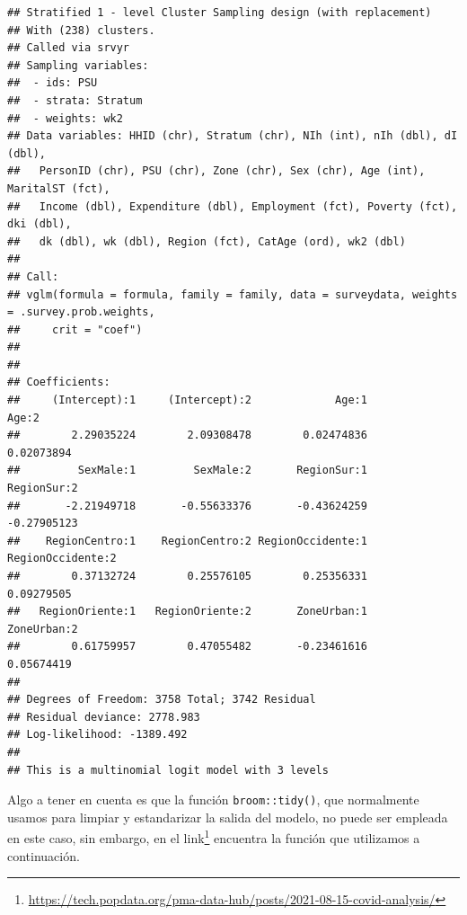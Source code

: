 \documentclass[
  12pt,
]{book}
\begin{document}
\begin{verbatim}
## Stratified 1 - level Cluster Sampling design (with replacement)
## With (238) clusters.
## Called via srvyr
## Sampling variables:
##  - ids: PSU
##  - strata: Stratum
##  - weights: wk2
## Data variables: HHID (chr), Stratum (chr), NIh (int), nIh (dbl), dI (dbl),
##   PersonID (chr), PSU (chr), Zone (chr), Sex (chr), Age (int), MaritalST (fct),
##   Income (dbl), Expenditure (dbl), Employment (fct), Poverty (fct), dki (dbl),
##   dk (dbl), wk (dbl), Region (fct), CatAge (ord), wk2 (dbl)
## 
## Call:
## vglm(formula = formula, family = family, data = surveydata, weights = .survey.prob.weights, 
##     crit = "coef")
## 
## 
## Coefficients:
##     (Intercept):1     (Intercept):2             Age:1             Age:2 
##        2.29035224        2.09308478        0.02474836        0.02073894 
##         SexMale:1         SexMale:2       RegionSur:1       RegionSur:2 
##       -2.21949718       -0.55633376       -0.43624259       -0.27905123 
##    RegionCentro:1    RegionCentro:2 RegionOccidente:1 RegionOccidente:2 
##        0.37132724        0.25576105        0.25356331        0.09279505 
##   RegionOriente:1   RegionOriente:2       ZoneUrban:1       ZoneUrban:2 
##        0.61759957        0.47055482       -0.23461616        0.05674419 
## 
## Degrees of Freedom: 3758 Total; 3742 Residual
## Residual deviance: 2778.983 
## Log-likelihood: -1389.492 
## 
## This is a multinomial logit model with 3 levels
\end{verbatim}

Algo a tener en cuenta es que la función \texttt{broom::tidy()}, que normalmente usamos para limpiar y estandarizar la salida del modelo, no puede ser empleada en este caso, sin embargo, en el link\footnote{\url{https://tech.popdata.org/pma-data-hub/posts/2021-08-15-covid-analysis/}} encuentra la función que utilizamos a continuación.
\end{document}
